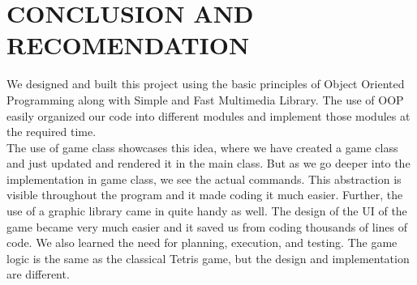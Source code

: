 \newpage
\section{CONCLUSION AND RECOMENDATION}

\hspace{5mm} We designed and built this project using the basic principles of Object Oriented Programming along with Simple and Fast Multimedia Library. The use of OOP easily organized our code into different modules and implement those modules at the required time. \\

The use of game class showcases this idea, where we have created a game class and just updated and rendered it in the main class. But as we go deeper into the implementation in game class, we see the actual commands. This abstraction is visible throughout the program and it made coding it much easier. Further, the use of a graphic library came in quite handy as well. The design of the UI of the game became very much easier and it saved us from coding thousands of lines of code. We also learned the need for planning, execution, and testing. The game logic is the same as the classical Tetris game, but the design and implementation are different.